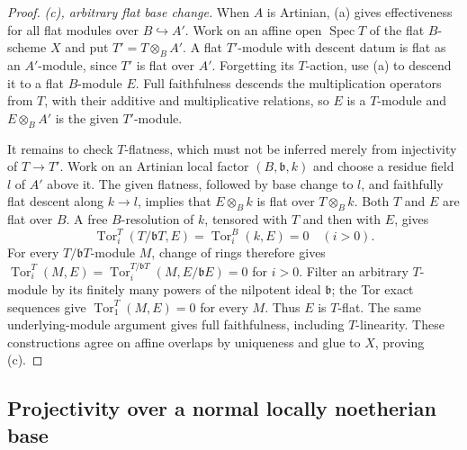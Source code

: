 \begin{proof}
\emph{(c), arbitrary flat base change.}
When $A$ is Artinian, (a) gives effectiveness for all flat modules over
$B\hookrightarrow A'$.  Work on an affine open
$\operatorname{Spec}T$ of the flat $B$-scheme $X$ and put
$T'=T\otimes_B A'$.  A flat $T'$-module with descent datum is flat as an
$A'$-module, since $T'$ is flat over $A'$.  Forgetting its $T$-action,
use (a) to descend it to a flat $B$-module $E$.  Full faithfulness descends
the multiplication operators from $T$, with their additive and
multiplicative relations, so $E$ is a $T$-module and
$E\otimes_B A'$ is the given $T'$-module.

It remains to check $T$-flatness, which must not be inferred merely from
injectivity of $T\to T'$.  Work on an Artinian local factor $(B,\mathfrak b,k)$
and choose a residue field $l$ of $A'$ above it.  The given flatness,
followed by base change to $l$, and faithfully flat descent along $k\to l$,
implies that $E\otimes_B k$ is flat over $T\otimes_B k$.
Both $T$ and $E$ are flat over $B$.  A free $B$-resolution of $k$,
tensored with $T$ and then with $E$, gives
\[
 \operatorname{Tor}_i^T(T/\mathfrak bT,E)
       =\operatorname{Tor}_i^B(k,E)=0\quad(i>0).
\]
For every $T/\mathfrak bT$-module $M$, change of rings therefore gives
$\operatorname{Tor}_i^T(M,E)=
\operatorname{Tor}_i^{T/\mathfrak bT}(M,E/\mathfrak bE)=0$ for $i>0$.
Filter an arbitrary $T$-module by its finitely many powers of the
nilpotent ideal $\mathfrak b$; the Tor exact sequences give
$\operatorname{Tor}_1^T(M,E)=0$ for every $M$.  Thus $E$ is $T$-flat.
The same underlying-module argument gives full faithfulness, including
$T$-linearity.  These constructions agree on affine overlaps by
uniqueness and glue to $X$, proving (c).
\end{proof}

\subsection{Projectivity over a normal locally noetherian base}

